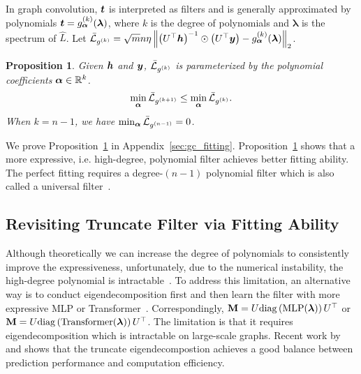 \documentclass{article} %
\def\valpha{{\bm\alpha}}
\def\vlambda{{\bm\lambda}}
\newtheorem{proposition}{\textbf{Proposition}} %
\begin{document}
In graph convolution, ${\bm{t}}$ is interpreted as filters and is generally approximated by polynomials $\vt=g_{\valpha}^{(k)}(\vlambda)$, where $k$ is the degree of polynomials and $\vlambda$ is the spectrum of $\hat L$.
Let $\bar\gL_{g^{(k)}}=\sqrt{m}n\eta\left\|\left(U^{\top}\vh\right)^{-1}\odot\left(U^{\top}\vy\right)-g_{\valpha}^{(k)}(\vlambda)\right\|_2$.
\begin{proposition}
	\label{prop:gc_fitting}
	Given ${\bm{h}}$ and ${\bm{y}}$, $\bar{{\mathcal{L}}}_{g^{(k)}}$ is parameterized by the polynomial coefficients $\valpha\in\sR^k$.
	\begin{equation}
		\begin{aligned}
			\min_{\valpha}\bar\gL_{g^{(k+1)}}\leq\min_{\valpha}\bar\gL_{g^{(k)}}.
		\end{aligned}
	\end{equation}
	When $k=n-1$, we have $\min_{\valpha}\bar\gL_{g^{(n-1)}}=0$.
\end{proposition}
We prove Proposition~\ref{prop:gc_fitting} in Appendix~\ref{sec:gc_fitting}.
Proposition~\ref{prop:gc_fitting} shows that a more expressive, i.e. high-degree, polynomial filter achieves better fitting ability.
The perfect fitting requires a degree-$(n-1)$ polynomial filter which is also called a universal filter~\citep{he2021bernnet,yang2022spectrum}.

\subsection{Revisiting Truncate Filter via Fitting Ability}

Although theoretically we can increase the degree of polynomials to consistently improve the expressiveness, unfortunately, due to the numerical instability, the high-degree polynomial is intractable~\citep{yang2022spectrum}.
To address this limitation, an alternative way is to conduct eigendecomposition first and then learn the filter with more expressive MLP or Transformer~\citep{lingam2022piece,yang2022spectrum,bo2022specformer}.
Correspondingly, $\rmM=U\mathrm{diag}\left(\mathrm{MLP}(\vlambda)\right)U^{\top}$ or $\rmM=U\mathrm{diag}\left(\mathrm{Transformer}(\vlambda)\right)U^{\top}$.
The limitation is that it requires eigendecomposition which is intractable on large-scale graphs.
Recent work by \cite{lingam2022piece} and \cite{bo2022specformer} shows that the truncate eigendecompostion achieves a good balance between prediction performance and computation efficiency.
\end{document}
